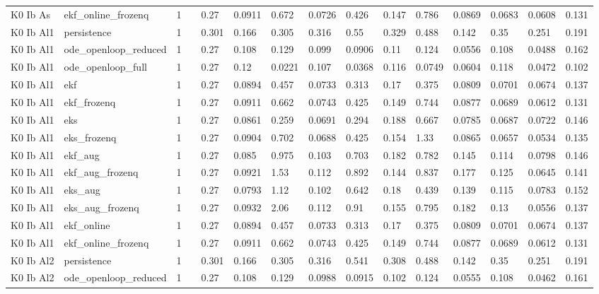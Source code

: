 \begin{table}[t]
\begin{tabular}{lllllllllllllll}
K0 Ib As & ekf\_online\_frozenq & 1 &  & 0.27 & 0.0911 & 0.672 & 0.0726 & 0.426 & 0.147 & 0.786 & 0.0869 & 0.0683 & 0.0608 & 0.131 \\
K0 Ib Al1 & persistence & 1 &  & 0.301 & 0.166 & 0.305 & 0.316 & 0.55 & 0.329 & 0.488 & 0.142 & 0.35 & 0.251 & 0.191 \\
K0 Ib Al1 & ode\_openloop\_reduced & 1 &  & 0.27 & 0.108 & 0.129 & 0.099 & 0.0906 & 0.11 & 0.124 & 0.0556 & 0.108 & 0.0488 & 0.162 \\
K0 Ib Al1 & ode\_openloop\_full & 1 &  & 0.27 & 0.12 & 0.0221 & 0.107 & 0.0368 & 0.116 & 0.0749 & 0.0604 & 0.118 & 0.0472 & 0.102 \\
K0 Ib Al1 & ekf & 1 &  & 0.27 & 0.0894 & 0.457 & 0.0733 & 0.313 & 0.17 & 0.375 & 0.0809 & 0.0701 & 0.0674 & 0.137 \\
K0 Ib Al1 & ekf\_frozenq & 1 &  & 0.27 & 0.0911 & 0.662 & 0.0743 & 0.425 & 0.149 & 0.744 & 0.0877 & 0.0689 & 0.0612 & 0.131 \\
K0 Ib Al1 & eks & 1 &  & 0.27 & 0.0861 & 0.259 & 0.0691 & 0.294 & 0.188 & 0.667 & 0.0785 & 0.0687 & 0.0722 & 0.146 \\
K0 Ib Al1 & eks\_frozenq & 1 &  & 0.27 & 0.0904 & 0.702 & 0.0688 & 0.425 & 0.154 & 1.33 & 0.0865 & 0.0657 & 0.0534 & 0.135 \\
K0 Ib Al1 & ekf\_aug & 1 &  & 0.27 & 0.085 & 0.975 & 0.103 & 0.703 & 0.182 & 0.782 & 0.145 & 0.114 & 0.0798 & 0.146 \\
K0 Ib Al1 & ekf\_aug\_frozenq & 1 &  & 0.27 & 0.0921 & 1.53 & 0.112 & 0.892 & 0.144 & 0.837 & 0.177 & 0.125 & 0.0645 & 0.141 \\
K0 Ib Al1 & eks\_aug & 1 &  & 0.27 & 0.0793 & 1.12 & 0.102 & 0.642 & 0.18 & 0.439 & 0.139 & 0.115 & 0.0783 & 0.152 \\
K0 Ib Al1 & eks\_aug\_frozenq & 1 &  & 0.27 & 0.0932 & 2.06 & 0.112 & 0.91 & 0.155 & 0.795 & 0.182 & 0.13 & 0.0556 & 0.137 \\
K0 Ib Al1 & ekf\_online & 1 &  & 0.27 & 0.0894 & 0.457 & 0.0733 & 0.313 & 0.17 & 0.375 & 0.0809 & 0.0701 & 0.0674 & 0.137 \\
K0 Ib Al1 & ekf\_online\_frozenq & 1 &  & 0.27 & 0.0911 & 0.662 & 0.0743 & 0.425 & 0.149 & 0.744 & 0.0877 & 0.0689 & 0.0612 & 0.131 \\
K0 Ib Al2 & persistence & 1 &  & 0.301 & 0.166 & 0.305 & 0.316 & 0.541 & 0.308 & 0.488 & 0.142 & 0.35 & 0.251 & 0.191 \\
K0 Ib Al2 & ode\_openloop\_reduced & 1 &  & 0.27 & 0.108 & 0.129 & 0.0988 & 0.0915 & 0.102 & 0.124 & 0.0555 & 0.108 & 0.0462 & 0.161 \\

\end{tabular}
\end{table}
